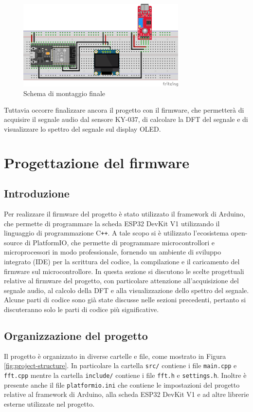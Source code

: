 \documentclass[a4paper,12pt]{report}  %
\newcommand{\lstinlinebg}[1]{\colorbox{backcolour}{\lstinline|#1|}}
\begin{document}
\begin{figure}[h]
    \centering
    \includegraphics[width=0.75\textwidth]{imgs/schema-di-montaggio.png}
    \caption{Schema di montaggio finale}
    \label{fig:final-schematic}
\end{figure}

Tuttavia occorre finalizzare ancora il progetto con il firmware, che permetterà di acquisire il segnale audio dal sensore KY-037, di calcolare la DFT del segnale e di visualizzare lo spettro del segnale sul display OLED.

\section{Progettazione del firmware}\label{sec:code}

\subsection{Introduzione}
Per realizzare il firmware del progetto è stato utilizzato il framework di Arduino, che permette di programmare la scheda ESP32 DevKit V1 utilizzando il linguaggio di programmazione C\texttt{++}.
A tale scopo si è utilizzato l'ecosistema open-source di PlatformIO, che permette di programmare microcontrollori e microprocessori in modo professionale, fornendo un ambiente di sviluppo integrato (IDE) per la scrittura del codice, la compilazione e il caricamento del firmware sul microcontrollore.
In questa sezione si discutono le scelte progettuali relative al firmware del progetto, con particolare attenzione all'acquisizione del segnale audio, al calcolo della DFT e alla visualizzazione dello spettro del segnale.
Alcune parti di codice sono già state discusse nelle sezioni precedenti, pertanto si discuteranno solo le parti di codice più significative.

\subsection{Organizzazione del progetto}
Il progetto è organizzato in diverse cartelle e file, come mostrato in Figura \ref{fig:project-structure}.
In particolare la cartella \lstinlinebg{src/} contiene i file \lstinlinebg{main.cpp} e \lstinlinebg{fft.cpp} mentre la cartella \lstinlinebg{include/} contiene i file \lstinlinebg{fft.h} e \lstinlinebg{settings.h}.
Inoltre è presente anche il file \lstinlinebg{platformio.ini} che contiene le impostazioni del progetto relative al framework di Arduino, alla scheda ESP32 DevKit V1 e ad altre librerie esterne utilizzate nel progetto.
\end{document}
